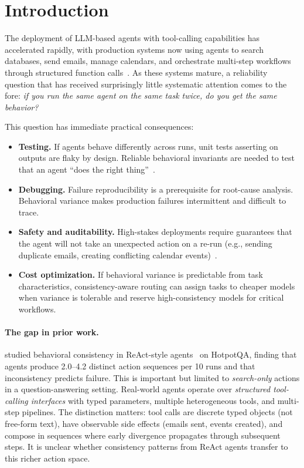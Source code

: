 \documentclass[letterpaper]{article}
\begin{document}
\section{Introduction}

The deployment of LLM-based agents with tool-calling capabilities has accelerated
rapidly, with production systems now using agents to search databases, send emails,
manage calendars, and orchestrate multi-step workflows through structured function
calls~\citep{qin2023toolllm,li2023apibank,schick2023toolformer}. As these systems
mature, a reliability question that has received surprisingly little systematic
attention comes to the fore: \emph{if you run the same agent on the same task
twice, do you get the same behavior?}

This question has immediate practical consequences:
\begin{itemize}[leftmargin=1.5em]
  \item \textbf{Testing.} If agents behave differently across runs, unit tests
    asserting on outputs are flaky by design. Reliable behavioral invariants are
    needed to test that an agent ``does the right thing''~\citep{kapoor2024ai}.
  \item \textbf{Debugging.} Failure reproducibility is a prerequisite for root-cause
    analysis. Behavioral variance makes production failures intermittent and
    difficult to trace.
  \item \textbf{Safety and auditability.} High-stakes deployments require
    guarantees that the agent will not take an unexpected action on a re-run
    (e.g., sending duplicate emails, creating conflicting calendar
    events)~\citep{weidinger2021ethical}.
  \item \textbf{Cost optimization.} If behavioral variance is predictable from task
    characteristics, consistency-aware routing can assign tasks to cheaper models
    when variance is tolerable and reserve high-consistency models for critical
    workflows.
\end{itemize}

\paragraph{The gap in prior work.}
\citet{mehta2026disagree} studied behavioral consistency in ReAct-style
agents~\citep{yao2023react} on HotpotQA, finding that agents produce 2.0--4.2
distinct action sequences per 10 runs and that inconsistency predicts failure.
This is important but limited to \emph{search-only} actions in a question-answering
setting. Real-world agents operate over \emph{structured tool-calling interfaces}
with typed parameters, multiple heterogeneous tools, and multi-step pipelines.
The distinction matters: tool calls are discrete typed objects (not free-form text),
have observable side effects (emails sent, events created), and compose in
sequences where early divergence propagates through subsequent steps. It is
unclear whether consistency patterns from ReAct agents transfer to this richer
action space.
\end{document}
